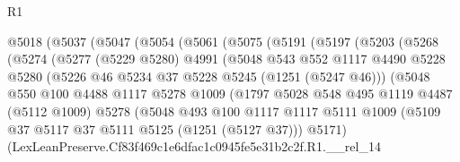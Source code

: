 \begin{lexlean}{R1}
\begin{coremodule}
                @5018
                  (@5037
                    (@5047
                      (@5054
                        (@5061
                          (@5075
                            (@5191
                              (@5197
                                (@5203
                                  (@5268
                                    (@5274
                                      (@5277
                                        (@5229 @5280)
                                        @4991
                                        (@5048
                                          @543
                                          @552
                                          @1117
                                          @4490
                                          @5228
                                          @5280
                                          (@5226 @46 @5234 @37 @5228 @5245 (@1251 (@5247 @46)))
                                          (@5048
                                            @550
                                            @100
                                            @4488
                                            @1117
                                            @5278
                                            @1009
                                            (@1797
                                              @5028
                                              @548
                                              @495
                                              @1119
                                              @4487
                                              (@5112 @1009)
                                              @5278
                                              (@5048
                                                @493
                                                @100
                                                @1117
                                                @1117
                                                @5111
                                                @1009
                                                (@5109
                                                  @37
                                                  @5117
                                                  @37
                                                  @5111
                                                  @5125
                                                  (@1251 (@5127 @37)))
                                                @5171)
                                              (LexLeanPreserve.Cf83f469c1e6dfac1c0945fe5e31b2c2f.R1.__rel_14

\end{coremodule}
\end{lexlean}
